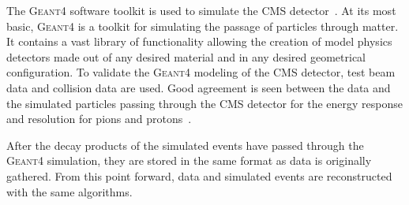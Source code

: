 The \textsc{Geant4} software toolkit is used to simulate the CMS 
detector~\cite{Agostinelli:2002hh}. At its most basic, \textsc{Geant4} is a 
toolkit for simulating the passage of particles through matter. It contains a 
vast library of functionality allowing the creation of model physics detectors
made out of any desired material and in any desired geometrical configuration.
To validate the \textsc{Geant4} modeling of the CMS detector, test beam data and
collision data are used. Good agreement is seen between the data and the
simulated particles passing through the CMS detector for the energy response
and resolution for pions and protons~\cite{geant4_cms_2017}.

After the decay products of the simulated events have passed through the \textsc{Geant4}
simulation, they are stored in the same format as data is originally gathered. From
this point forward, data and simulated events are reconstructed with the same 
algorithms.




